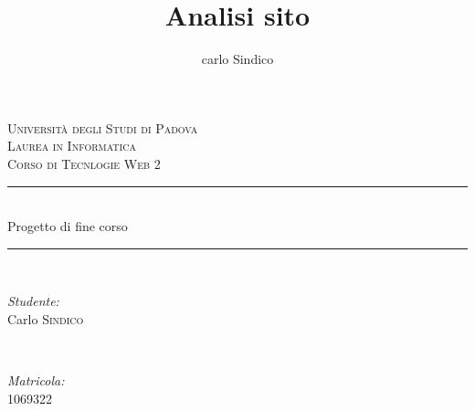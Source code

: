 \documentclass[12pt]{article}
\title{Analisi sito}
\date{}
\author{carlo Sindico}
\begin{document}



\begin{titlepage}

\newcommand{\HRule}{\rule{\linewidth}{0.5mm}} %

\center %
 

\textsc{\LARGE Universit\`a degli Studi di Padova}\\[1.5cm] %
\textsc{\Large Laurea in Informatica}\\[0.5cm] %
\textsc{\large Corso di Tecnlogie Web 2}\\[0.5cm] %


\HRule \\[0.4cm]
{ \huge  Progetto di fine corso}\\[0.3cm] %
\HRule \\[1.5cm]
 

\begin{minipage}{0.4\textwidth}
\begin{flushleft} \large
\emph{Studente:}\\
Carlo \textsc{Sindico} %
\end{flushleft}
\end{minipage}
~
\begin{minipage}{0.4\textwidth}
\begin{flushright} \large
\emph{Matricola:} \\
\textsc{1069322} %
\end{flushright}
\end{minipage}\\[4cm]


\end{titlepage}
\end{document}
